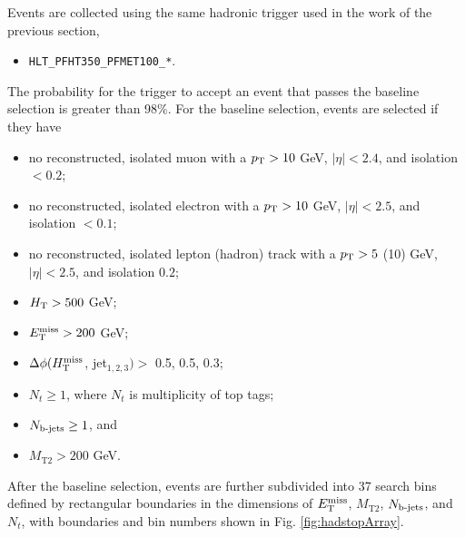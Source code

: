 Events are collected using the same hadronic trigger used in the work of the previous section,
\begin{itemize}
  \item \texttt{HLT\_PFHT350\_PFMET100\_*}.
\end{itemize}
The probability for the trigger to accept an event that passes the baseline selection is greater than 98\%. For the baseline selection, events are selected if they have
\begin{itemize}
\item no reconstructed, isolated muon with a $p_{\text{T}}>10$ GeV, $|\eta|<2.4$, and isolation $<0.2$;
\item no reconstructed, isolated electron with a $p_{\text{T}}>10$ GeV, $|\eta|<2.5$, and isolation $<0.1$;
\item no reconstructed, isolated lepton (hadron) track with a $p_{\text{T}}>5$ (10) GeV, $|\eta|<2.5$, and isolation $0.2$;
\item $H_{\rm T}>500$ GeV;
\item $E_{\text{T}}^{\rm miss}>200$ GeV;
\item $\Delta\phi(H_{\text{T}}^{\rm miss}$, jet$_{1,2,3})>$ 0.5, 0.5, 0.3;
\item $N_t\geq1$, where $N_t$ is multiplicity of top tags;
\item $N_{\text{b-jets}}\geq1$, and
\item $M_{\text{T2}}>200$ GeV.
\end{itemize}
After the baseline selection, events are further subdivided into 37 search bins defined by rectangular boundaries in the dimensions of $E_{\text{T}}^{\rm miss}$, $M_{\text{T2}}$, $N_{\text{b-jets}}$, and $N_t$, with boundaries and bin numbers shown in Fig. \ref{fig:hadstopArray}.
